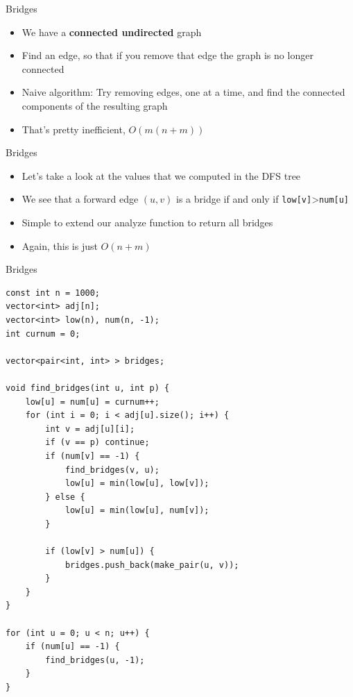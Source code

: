 \documentclass{beamer}
\begin{document}
\begin{frame}[plain]{Bridges}
    \vspace{20pt}
    \begin{itemize}
        \item We have a \textbf{connected undirected} graph
        \item Find an edge, so that if you remove that edge the graph is no longer connected
        \vspace{10pt}
        \item Naive algorithm: Try removing edges, one at a time, and find the connected components of the resulting graph
        \item That's pretty inefficient, $O(m(n + m))$
    \end{itemize}
\end{frame}

\begin{frame}[plain]{Bridges}
    \vspace{20pt}
    \begin{itemize}
        \item Let's take a look at the values that we computed in the DFS tree
        \vspace{10pt}
        \item We see that a forward edge $(u,v)$ is a bridge if and only if \texttt{low[v]}>\texttt{num[u]}
        \vspace{10pt}
        \item Simple to extend our analyze function to return all bridges
        \item Again, this is just $O(n + m)$
    \end{itemize}
\end{frame}

\begin{frame}{Bridges}
    \begin{verbatim}
const int n = 1000;
vector<int> adj[n];
vector<int> low(n), num(n, -1);
int curnum = 0;

vector<pair<int, int> > bridges;

void find_bridges(int u, int p) {
    low[u] = num[u] = curnum++;
    for (int i = 0; i < adj[u].size(); i++) {
        int v = adj[u][i];
        if (v == p) continue;
        if (num[v] == -1) {
            find_bridges(v, u);
            low[u] = min(low[u], low[v]);
        } else {
            low[u] = min(low[u], num[v]);
        }

        if (low[v] > num[u]) {
            bridges.push_back(make_pair(u, v));
        }
    }
}

for (int u = 0; u < n; u++) {
    if (num[u] == -1) {
        find_bridges(u, -1);
    }
}
    \end{verbatim}
\end{frame}
\end{document}
